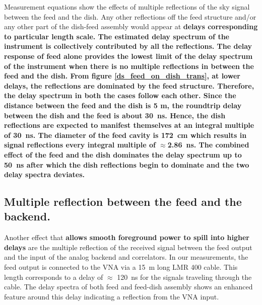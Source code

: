 \documentclass[twocolumn]{emulateapj}
\begin{document}
    Measurement equations show the effects of multiple reflections of the sky
    signal between the feed and the dish. Any other reflections off the feed
    structure and/or any other part of the dish-feed assembly would appear at
    \textbf{delays corresponding to particular length scale. The estimated delay spectrum of the instrument is
    collectively contributed by all the reflections. The delay response of
    feed alone provides the lowest limit of
    the delay spectrum of the instrument when there is no multiple
    reflections in between the feed and the dish.  From figure
    \ref{ds_feed_on_dish_trans}, at lower delays, the reflections are dominated by
    the feed structure. Therefore, the delay spectrum in both the cases follow each
    other. Since the distance between the feed and the dish is 5 m, the roundtrip
    delay between the dish and the feed is about 30~ns. Hence, the dish
    reflections are expected to manifest themselves at an integral multiple of
    30~ns. The diameter of the feed cavity is 172~cm  which results in signal
    reflections every integral multiple of $\approx$2.86~ns. The combined effect of
    the feed and the dish dominates the delay spectrum up to $\> $50~ns after which the
    dish reflections begin to dominate and the two delay spectra deviates. }
    
    \subsection{Multiple reflection between the feed and the backend.}
    
    Another effect that \textbf{allows smooth foreground power to spill into higher delays}
    are the multiple reflection of the received signal between the feed output and
    the input of the analog backend and correlators. In our measurements, the feed
    output is connected to the VNA via a 15~m long LMR 400 cable. This length
    corresponds to a delay of $\approx$ 120~ns for the signals traveling through
    the cable. The delay spectra of both feed and feed-dish assembly shows an
    enhanced feature around this delay indicating a reflection from the VNA input.
    
\end{document}
